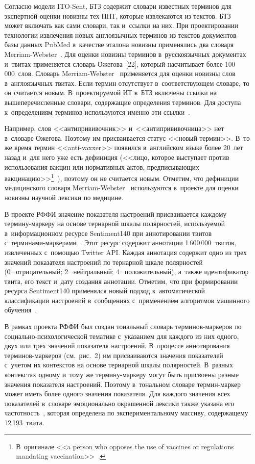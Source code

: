 \begin{multicols}{2}
  Согласно модели ITO-Sent, БТЗ содержит словари известных терминов для 
экспертной оценки новизны тех ПНТ, которые извлекаются из текстов. БТЗ может 
включать как сами словари, так и~ссылки на них. При проектировании технологии 
извлечения новых англоязычных терминов из текстов документов базы данных 
PubMed в~качестве эталона новизны применялись два словаря  
Merriam-Webster~\cite{20-zac, 21-zac}. Для оценки новизны терминов 
в~русскоязычных документах и~твитах применяется словарь Ожегова~[22], 
который насчитывает более 100\,000~слов. Словарь Merriam-Webster~\cite{20-zac} 
применяется для оценки новизны слов в~англоязычных твитах. Если термин 
отсутствует в~со\-от\-вет\-ст\-ву\-ющем словаре, то он считается новым. В~про\-ек\-ти\-ру\-емой 
ИТ в~БТЗ включены ссылки на вышеперечисленные 
словари, содержащие определения терминов. Для доступа к~определениям 
терминов используются именно эти ссылки~\cite{20-zac, 21-zac, 22-zac}.
  
  Например, слов <<антипрививочник>> и~<<антипрививочница>> нет в~словаре 
Ожегова. Поэтому им присваивается статус <<новый термин>>. В~то же время 
термин <<anti-vaxxer>> появился в~английском языке более 20~лет назад и~для 
него уже есть дефиниция (<<лицо, которое выступает против использования 
вакцин или нормативных актов, предписывающих 
вакцинацию>>\footnote{В~оригинале <<a person who opposes the use of vaccines or regulations 
mandating vaccination>>~\cite{23-zac}.}~\cite{23-zac}), поэтому он не считается новым. 
Отметим, что дефиниции медицинского словаря Merriam-Webster~\cite{21-zac} 
используются в~проекте для оценки новизны научной лексики по медицине.
  
  В проекте РФФИ значение показателя настроений присваивается каждому 
термину-маркеру на основе тернарной шкалы полярностей, используемой 
в~информационном ресурсе Sentiment140 при аннотировании твитов  
с~тер\-ми\-на\-ми-мар\-ке\-ра\-ми~\cite{24-zac}. Этот ресурс содержит аннотации 
1\,600\,000~твитов, извлеченных с~помощью Twitter API. Каждая аннотация 
содержит одно из трех значений показателя настроений по тернарной шкале 
полярностей (0\;=\;от\-ри\-ца\-тель\-ный; 2\;=\;нейт\-раль\-ный;  
4\;=\;по\-ло\-жи\-тель\-ный), а~также идентификатор твита, его текст и~дату 
создания аннотации. Отметим, что при формировании ресурса Sentiment140 
применялся новый подход к~автоматической классификации настроений 
в~сообщениях с~применением алгоритмов машинного обучения~\cite{25-zac}.
  
  В рамках проекта РФФИ был создан тональный словарь терминов-маркеров по 
социально-пси\-хо\-ло\-ги\-че\-ской тематике с~указанием для каждого из них одного, 
двух или трех значений показателя настроений. В~процессе аннотирования 
тер\-ми\-нов-мар\-ке\-ров (см.\ рис.~2) им присваиваются значения показателей с~учетом их 
контекстов на основе тернарной шкалы полярностей. В~разных контекстах 
одному и~тому же тер\-ми\-ну-мар\-ке\-ру могут быть присвоены разные значения 
показателя настроений. Поэтому в~тональном словаре термин-маркер может иметь 
более одного значения показателя. Для каждого значения всех показателей 
в~словаре эмоционально окрашенной лексики также указана его 
частотность~\cite{26-zac}, которая определена по экспериментальному массиву, 
содержащему 12\,193~твита.
  

\end{multicols}
